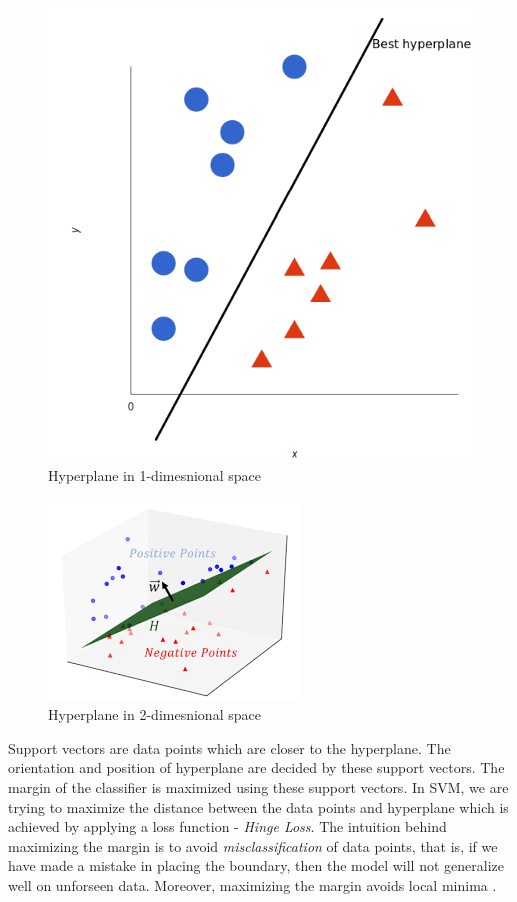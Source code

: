 \documentclass[format=sigconf]{acmart}
\begin{document}
\begin{figure}[H]
    \centering
    \includegraphics[scale=0.25]{svm_hyperplane_1.png}
    \caption{Hyperplane in 1-dimesnional space}
    \label{fig:svm_hyperplane_1}
\end{figure}
\begin{figure}[H]
    \centering
    \includegraphics[scale=0.60]{svm_hyperplane_2.png}
    \caption{Hyperplane in 2-dimesnional space}
    \label{fig:svm_hyperplane_2}
\end{figure}

Support vectors are data points which are closer to the hyperplane. The orientation and position of hyperplane are decided by 
these support vectors. The margin of the classifier is maximized using these support vectors. In SVM, we are trying to maximize 
the distance between the data points and hyperplane which is achieved by applying a loss function - \textit{Hinge Loss}. The intuition
behind maximizing the margin is to avoid \textit{misclassification} of data points, that is, if we have made a mistake in placing 
the boundary, then the model will not generalize well on unforseen data. Moreover, maximizing the margin avoids local minima
\cite{jakkula2006tutorial}. 
\end{document}
